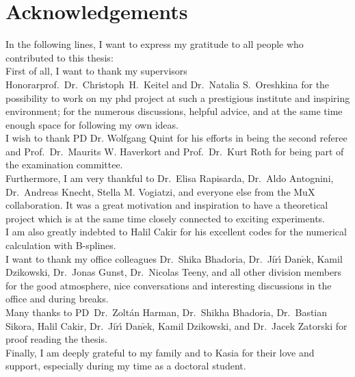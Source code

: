 \chapter*{Acknowledgements}

In the following lines, I want to express my gratitude to all people who contributed to this thesis:\\
First of all, I want to thank my supervisors Honorarprof.~Dr.~Christoph~H.~Keitel and Dr.~Natalia S.~Oreshkina for the possibility to work on my phd project at such a prestigious institute and inspiring environment; for the numerous discussions, helpful advice, and at the same time enough space for following my own ideas.\\
I wish to thank PD Dr. Wolfgang Quint for his efforts in being the second referee and Prof.~Dr.~Maurits W. Haverkort and Prof.~Dr.~Kurt Roth for being part of the examination committee.\\
Furthermore, I am very thankful to Dr.~Elisa Rapisarda, Dr.~Aldo Antognini, Dr.~Andreas Knecht, Stella M. Vogiatzi, and everyone else from the MuX collaboration. It was a great motivation and inspiration to have a theoretical project which is at the same time closely connected to exciting experiments.\\
I am also greatly indebted to Halil Cakir for his excellent codes for the numerical calculation with B-splines.\\
I want to thank my  office colleagues Dr.~Shika Bhadoria, Dr.~Ji$\check{\text{r}}${\'\i} Dan$\check{\text{e}}$k, Kamil Dzikowski, Dr.~Jonas Gunst, Dr.~Nicolas Teeny, and all other division members for the good atmosphere, nice conversations and interesting discussions in the office and during breaks.\\
Many thanks to PD~Dr.~Zoltán Harman, Dr.~Shikha Bhadoria, Dr.~Bastian Sikora, Halil Cakir, Dr.~Ji$\check{\text{r}}${\'\i} Dan$\check{\text{e}}$k, Kamil Dzikowski, and Dr.~Jacek Zatorski for proof reading the thesis.\\%
Finally, I am deeply grateful to my family and to Kasia for their love and support, especially during my time as a doctoral student.
%



